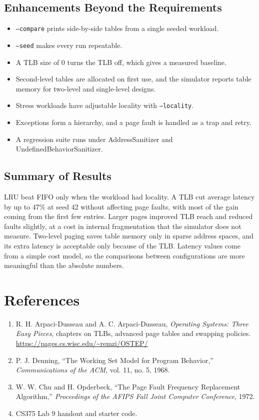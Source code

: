 \documentclass[11pt]{article}
\newcommand{\code}[1]{\texttt{#1}}
\begin{document}
\subsection{Enhancements Beyond the Requirements}
\begin{itemize}
  \item \code{--compare} prints side-by-side tables from a single seeded workload.
  \item \code{--seed} makes every run repeatable.
  \item A TLB size of 0 turns the TLB off, which gives a measured baseline.
  \item Second-level tables are allocated on first use, and the simulator reports
        table memory for two-level and single-level designs.
  \item Stress workloads have adjustable locality with \code{--locality}.
  \item Exceptions form a hierarchy, and a page fault is handled as a trap and retry.
  \item A regression suite runs under AddressSanitizer and UndefinedBehaviorSanitizer.
\end{itemize}

\subsection{Summary of Results}
LRU beat FIFO only when the workload had locality. A TLB cut average latency by up to
47\% at seed 42 without affecting page faults, with most of the gain coming from the
first few entries. Larger pages improved TLB reach and reduced faults slightly, at a
cost in internal fragmentation that the simulator does not measure. Two-level paging
saves table memory only in sparse address spaces, and its extra latency is acceptable
only because of the TLB. Latency values come from a simple cost model, so the
comparisons between configurations are more meaningful than the absolute numbers.

\section{References}
\begin{enumerate}
  \item R. H. Arpaci-Dusseau and A. C. Arpaci-Dusseau, \textit{Operating Systems: Three
        Easy Pieces}, chapters on TLBs, advanced page tables and swapping policies.
        \url{https://pages.cs.wisc.edu/~remzi/OSTEP/}
  \item P. J. Denning, ``The Working Set Model for Program Behavior,''
        \textit{Communications of the ACM}, vol. 11, no. 5, 1968.
  \item W. W. Chu and H. Opderbeck, ``The Page Fault Frequency Replacement Algorithm,''
        \textit{Proceedings of the AFIPS Fall Joint Computer Conference}, 1972.
  \item CS375 Lab 9 handout and starter code.
\end{enumerate}
\end{document}
